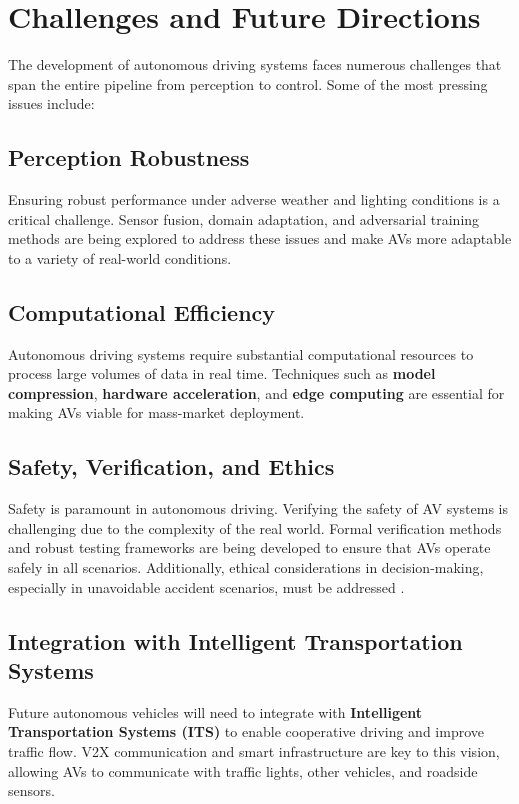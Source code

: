 \documentclass[12pt,a4paper]{article}
\begin{document}
\section{Challenges and Future Directions}
The development of autonomous driving systems faces numerous challenges that span the entire pipeline from perception to control. Some of the most pressing issues include:

\subsection{Perception Robustness}
Ensuring robust performance under adverse weather and lighting conditions is a critical challenge. Sensor fusion, domain adaptation, and adversarial training methods are being explored to address these issues and make AVs more adaptable to a variety of real-world conditions.

\subsection{Computational Efficiency}
Autonomous driving systems require substantial computational resources to process large volumes of data in real time. Techniques such as \textbf{model compression}, \textbf{hardware acceleration}, and \textbf{edge computing} are essential for making AVs viable for mass-market deployment.

\subsection{Safety, Verification, and Ethics}
Safety is paramount in autonomous driving. Verifying the safety of AV systems is challenging due to the complexity of the real world. Formal verification methods and robust testing frameworks are being developed to ensure that AVs operate safely in all scenarios. Additionally, ethical considerations in decision-making, especially in unavoidable accident scenarios, must be addressed \cite{maccarthy2024autonomous}.

\subsection{Integration with Intelligent Transportation Systems}
Future autonomous vehicles will need to integrate with \textbf{Intelligent Transportation Systems (ITS)} to enable cooperative driving and improve traffic flow. V2X communication and smart infrastructure are key to this vision, allowing AVs to communicate with traffic lights, other vehicles, and roadside sensors.
\end{document}
